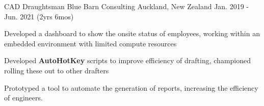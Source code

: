 \begin{cventries}
  \cventry
    {CAD Draughtsman} %
    {Blue Barn Consulting} %
    {Auckland, New Zealand} %
    {Jan. 2019 - Jun. 2021 (2yrs 6mos)} %
    {
      \begin{cvitems} %
        \item {Developed a dashboard to show the onsite status of employees, working within an embedded environment with limited compute resources}
        \item {Developed \textbf{AutoHotKey} scripts to improve efficiency of drafting, championed rolling these out to other drafters}
        \item {Prototyped a tool to automate the generation of reports, increasing the efficiency of engineers.}
      \end{cvitems}
    }


\end{cventries}
